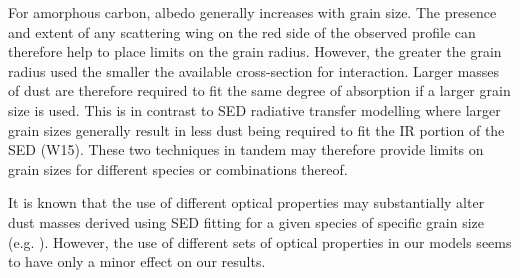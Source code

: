 \documentclass[useAMS,usenatbib,usegraphicx]{mnras}
\begin{document}
For amorphous carbon, albedo generally increases with grain size.  The presence and extent of any scattering wing on the red side of the observed profile can therefore help to place limits on the grain radius.  However, the greater the grain radius used the smaller the available cross-section for interaction.  Larger masses of dust 
are therefore required to fit the same degree of absorption if a larger 
grain size is used.  This is in contrast to SED radiative transfer 
modelling where larger grain sizes generally result in less dust being 
required to fit the IR portion of the SED (W15).  These two techniques in 
tandem may therefore provide limits on grain sizes for different 
species or combinations thereof.

It is known that the use of different 
optical properties may substantially alter dust masses derived using SED fitting for a given species of specific grain size (e.g. \citet{Owen2015}).  However, the use of different sets of optical properties in our models seems to have only a minor effect on our results.
\end{document}
